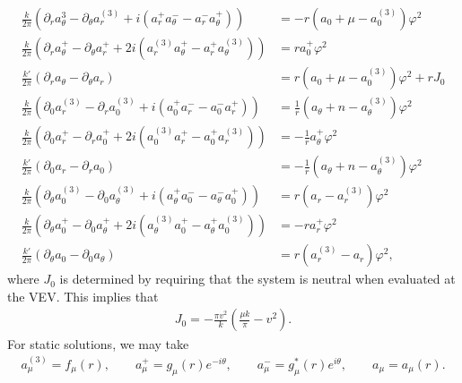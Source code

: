     \begin{align}
        \frac{k}{2 \pi} \left(\partial_{r} a_{\theta}^3 - \partial_{\theta} a_r^{(3)} + i \left(a_r^+ a_{\theta}^- - a_r^- a_{\theta}^{+} \right) \right) &= -r \left( a_0 + \mu - a^{(3)}_0 \right)\varphi^2 \\
        \frac{k}{2 \pi} \left(\partial_r a_{\theta}^{+} - \partial_{\theta} a_r^{+} +2i \left(a_r^{(3)} a_{\theta}^{+} - a_r^{+} a_{\theta}^{(3)} \right) \right) &=r a_0^{+} \varphi^2  \\
        \frac{k'}{2 \pi} \left(\partial_r a_{\theta} - \partial_{\theta} a_r \right) &=r \left(a_0 +\mu - a^{(3)}_0 \right) \varphi^2 + r J_0  \\
        \frac{k}{2 \pi}\left(\partial_{0}a_r^{(3)} - \partial_r a_0^{(3)} + i \left(a_0^+ a_r^- - a_0^- a_r^+  \right)  \right) &= \frac{1}{r} \left(a_{\theta}+n - a_{\theta}^{(3)} \right) \varphi^2  \\
        \frac{k}{2 \pi} \left( \partial_0 a_r^+ - \partial_r a_0^+ + 2i \left( a_0^{(3)} a_r^+ -a_0^+ a_r^{(3)} \right) \right) &= -\frac{1}{r} a_{\theta}^+ \varphi^2  \\
        \frac{k'}{2 \pi} \left( \partial_0 a_r - \partial_r a_0 \right) &= -\frac{1}{r} \left(a_{\theta} +n - a_{\theta}^{(3)} \right) \varphi^2 \\
        \frac{k}{2 \pi} \left(\partial_{\theta} a_0^{(3)} - \partial_0 a_{\theta}^{(3)} + i \left(a_{\theta}^+ a_0^- - a_{\theta}^- a_0^{+} \right) \right) &= r \left(a_r - a_r^{(3)}  \right) \varphi^2 \\
        \frac{k}{2 \pi} \left(\partial_{\theta} a_0^+ - \partial_0 a_{\theta}^+ + 2i \left(a_{\theta}^{(3)} a_0^+ - a_{\theta}^+ a_0^{(3)} \right) \right) &=-r a_r^+ \varphi^2\\
        \frac{k'}{2 \pi} \left(\partial_{\theta}a_0 -\partial_{0} a_{\theta} \right) &= r \left(a_r^{(3)}- a_r \right) \varphi^2,
    \end{align}
    where $J_0$ is determined by requiring that the system is neutral when evaluated at the VEV. This implies that
    \begin{align}
        J_0 = -\frac{\pi v^2}{k} \left(\frac{\mu k}{\pi}- v^2 \right) .
    \end{align}
    For static solutions, we may take
    \begin{align}
        a_{\mu}^{(3)} = f_{\mu}(r), \qquad a_{\mu}^+ = g_{\mu}(r)e^{-i \theta},\qquad a_{\mu}^- = g_{\mu}^*(r) e^{i \theta}, \qquad a_{\mu} = a_{\mu}(r).
    \end{align}
